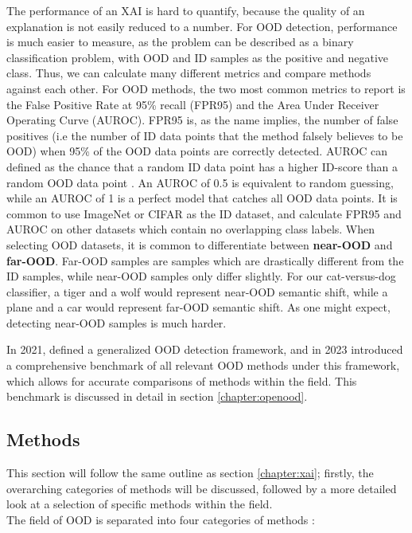 \documentclass[UKenglish]{uiomasterthesis} %
\theoremstyle{definition}
\begin{document}
The performance of an XAI is hard to quantify, because the quality of an explanation is not easily reduced to a number. For OOD detection, performance is much easier to measure, as the problem can be described as a binary classification problem, with OOD and ID samples as the positive and negative class. Thus, we can calculate many different metrics and compare methods against each other. For OOD methods, the two most common metrics to report is the False Positive Rate at 95\% recall (FPR95) and the Area Under Receiver Operating Curve (AUROC). FPR95 is, as the name implies, the number of false positives (i.e the number of ID data points that the method falsely believes to be OOD) when 95\% of the OOD data points are correctly detected. AUROC can defined as the chance that a random ID data point has a higher ID-score than a random OOD data point \cite{openood}. An AUROC of 0.5 is equivalent to random guessing, while an AUROC of 1 is a perfect model that catches all OOD data points. It is common to use ImageNet or CIFAR as the ID dataset, and calculate FPR95 and AUROC on other datasets which contain no overlapping class labels. When selecting OOD datasets, it is common to differentiate between \textbf{near-OOD} and \textbf{far-OOD}. Far-OOD samples are samples which are drastically different from the ID samples, while near-OOD samples only differ slightly. For our cat-versus-dog classifier, a tiger and a wolf would represent near-OOD semantic shift, while a plane and a car would represent far-OOD semantic shift. As one might expect, detecting near-OOD samples is much harder.

In 2021, \cite{oodoverview} defined a generalized OOD detection framework, and in 2023 \cite{openood} introduced a comprehensive benchmark of all relevant OOD methods under this framework, which allows for accurate comparisons of methods within the field. This benchmark is discussed in detail in section \ref{chapter:openood}.

\subsection{Methods}

This section will follow the same outline as section \ref{chapter:xai}; firstly, the overarching categories of methods will be discussed, followed by a more detailed look at a selection of specific methods within the field.
\\

The field of OOD is separated into four categories of methods \cite{oodoverview}:
\end{document}
